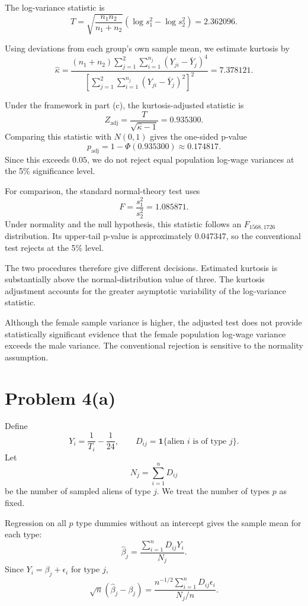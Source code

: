 \documentclass[11pt]{article}
\begin{document}
The log-variance statistic is
\[
T=
\sqrt{\frac{n_1n_2}{n_1+n_2}}
\left(\log s_1^2-\log s_2^2\right)
=2.362096.
\]

Using deviations from each group's own sample
mean, we estimate kurtosis by
\[
\widehat{\kappa}
=
\frac{
(n_1+n_2)
\sum_{j=1}^{2}\sum_{i=1}^{n_j}
(Y_{ji}-\bar Y_j)^4
}{
\left[
\sum_{j=1}^{2}\sum_{i=1}^{n_j}
(Y_{ji}-\bar Y_j)^2
\right]^2
}
=7.378121.
\]

Under the framework in part (c), the
kurtosis-adjusted statistic is
\[
Z_{\mathrm{adj}}
=\frac{T}{\sqrt{\widehat{\kappa}-1}}
=0.935300.
\]
Comparing this statistic with $N(0,1)$ gives
the one-sided p-value
\[
p_{\mathrm{adj}}
=1-\Phi(0.935300)
\approx0.174817.
\]
Since this exceeds $0.05$, we do not reject
equal population log-wage variances at the
5\% significance level.

For comparison, the standard normal-theory
test uses
\[
F=\frac{s_1^2}{s_2^2}=1.085871.
\]
Under normality and the null hypothesis,
this statistic follows an $F_{1568,1726}$
distribution. Its upper-tail p-value is
approximately $0.047347$, so the conventional
test rejects at the 5\% level.

\begin{table}[htbp]
\centering
\small
\caption{One-sided tests of equal log-wage variances}
\label{tab:ps3e}

\end{table}

The two procedures therefore give different
decisions. Estimated kurtosis is substantially
above the normal-distribution value of three.
The kurtosis adjustment accounts for the
greater asymptotic variability of the
log-variance statistic.

Although the female sample variance is higher,
the adjusted test does not provide statistically
significant evidence that the female population
log-wage variance exceeds the male variance.
The conventional rejection is sensitive to
the normality assumption.
\clearpage
\section*{Problem 4(a)}

Define
\[
Y_i=\frac{1}{T_i}-\frac{1}{24},
\qquad
D_{ij}=\mathbf{1}\{\text{alien }i
\text{ is of type }j\}.
\]
Let
\[
N_j=\sum_{i=1}^nD_{ij}
\]
be the number of sampled aliens of type $j$.
We treat the number of types $p$ as fixed.

Regression on all $p$ type dummies without
an intercept gives the sample mean for each type:
\[
\widehat{\beta}_j
=\frac{\sum_{i=1}^nD_{ij}Y_i}{N_j}.
\]
Since $Y_i=\beta_j+\epsilon_i$ for type $j$,
\[
\sqrt{n}(\widehat{\beta}_j-\beta_j)
=
\frac{
n^{-1/2}\sum_{i=1}^nD_{ij}\epsilon_i
}{
N_j/n
}.
\]
\end{document}
